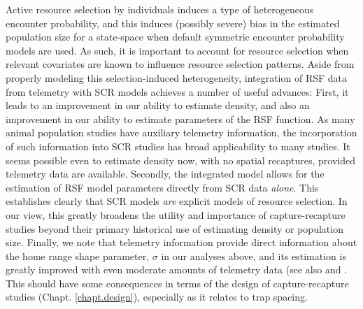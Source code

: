 
Active resource selection by individuals induces a type of
heterogeneous encounter probability, and this induces (possibly
severe) bias in the estimated population size for a state-space when
default symmetric encounter probability models are used.  As such, it
is important to account for resource selection
when relevant covariates are
known to influence resource selection patterns.  Aside from properly modeling
this selection-induced heterogeneity, integration of RSF data from
telemetry with SCR models achieves a number of useful advances: First,
it leads to an improvement in our ability to estimate density, and
also an improvement in our ability to estimate parameters of the RSF
function.  As many animal population studies have auxiliary telemetry
information, the incorporation of such information into SCR studies
has broad applicability to many studies.  It seems possible even to
estimate density now, with no spatial recaptures, provided telemetry
data are available.  Secondly, the integrated model allows for the
estimation of RSF model parameters directly from SCR data {\it alone}.
This establishes clearly that SCR models {\it are} explicit models of
resource selection. In our view, this greatly broadens the utility and
importance of capture-recapture studies beyond their primary
historical use of estimating density or population size. Finally, we
note that telemetry information provide direct information about the
home range shape parameter, $\sigma$ in our analyses above, and its
estimation is greatly improved with even moderate amounts of telemetry
data (see also \citet{sollmann_etal:2012ecol} and
\citet{sollmann_etal:inprepjapplecol}.  This should have some
consequences in terms of the design of capture-recapture studies
(Chapt. \ref{chapt.design}), especially as it relates to trap spacing.

